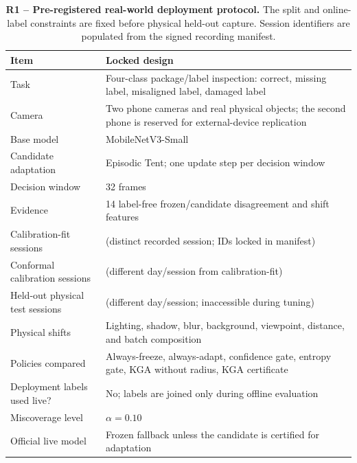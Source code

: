 \providecommand{\CamPending}{\textemdash}


\begin{table}[!t]
\centering
\caption{\textbf{R1 -- Pre-registered real-world deployment protocol.}
The split and online-label constraints are fixed before physical held-out capture.
Session identifiers are populated from the signed recording manifest.}
\label{tab:camera-r1}
\footnotesize
\renewcommand{\arraystretch}{1.08}
\begin{tabular}{@{}p{}p{}@{}}
\toprule
Item & Locked design \\
\midrule
Task & Four-class package/label inspection: correct, missing label, misaligned label, damaged label \\
Camera & Two phone cameras and real physical objects; the second phone is reserved for external-device replication \\
Base model & MobileNetV3-Small \\
Candidate adaptation & Episodic Tent; one update step per decision window \\
Decision window & 32 frames \\
Evidence & 14 label-free frozen/candidate disagreement and shift features \\
Calibration-fit sessions & \CameraROneFitSessions{} (distinct recorded session; IDs locked in manifest) \\
Conformal calibration sessions & \CameraROneConformalSessions{} (different day/session from calibration-fit) \\
Held-out physical test sessions & \CameraROneHeldoutSessions{} (different day/session; inaccessible during tuning) \\
Physical shifts & Lighting, shadow, blur, background, viewpoint, distance, and batch composition \\
Policies compared & Always-freeze, always-adapt, confidence gate, entropy gate, KGA without radius, KGA certificate \\
Deployment labels used live? & No; labels are joined only during offline evaluation \\
Miscoverage level & $\alpha=0.10$ \\
Official live model & Frozen fallback unless the candidate is certified for adaptation \\
\bottomrule
\end{tabular}
\end{table}

